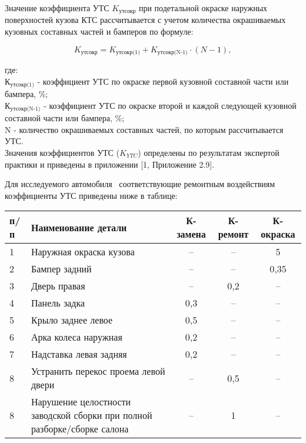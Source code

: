 \par   Значение коэффициента УТС $ K_{\text{утсокр}} $ при подетальной окраске наружных поверхностей кузова КТС рассчитывается с учетом количества окрашиваемых кузовных составных частей и бамперов по формуле:

\begin{equation}\label{f:yc}
K_{\text{утсокр}}=K_{\text{утсокр(1)}}+K_{\text{утсокр(N-1)}}\cdot(N-1), %
\end{equation}
        
\noindent где:\\
\noindent $ \text{К}_{\text{утсокр(1)}} $ - коэффициент УТС по окраске первой кузовной составной части или бампера, \%;\\
$ \text{К}_{\text{утсокр(N-1)}} $ - коэффициент УТС по окраске второй и каждой следующей кузовной составной части или бампера, \%;\\
N - количество окрашиваемых составных частей, по которым рассчитывается УТС.\\
Значения коэффициентов УТС ($ K_{YTC} $) определены по результатам экспертой практики и приведены в приложении [1, Приложение 2.9].

\par Для исследуемого автомобиля  \, соответствующие ремонтным воздействиям  коэффициенты УТС приведены ниже в таблице:

\begin{table}[H]
	\begin{tabular}{|p{5mm}|p{80mm}|c|c|c|}
	\hline 
	\textbf{п/п} & \textbf{Наименование детали} &\textbf{ К-замена }& \textbf{К-ремонт }&\textbf{ К-окраска} \\ 
	\hline 
	1 & Наружная окраска кузова & -- & -- & 5 \\ 
	\hline 
	2 & Бампер задний & -- & -- & 0,35 \\ 
	\hline 
	3 & Дверь правая & -- & 0,2 & -- \\ 
	\hline 
	4 & Панель задка & 0,3 & -- & -- \\ 
	\hline 
	5 & Крыло заднее левое & 0,5 & -- & -- \\ 
	\hline 
	6 & Арка колеса наружная & 0,2 & -- & -- \\ 
	\hline 
	7 & Надставка левая задняя & 0,2 & -- & -- \\ 
	\hline 
	8 &  Устранить перекос проема левой двери & -- & 0,5 & -- \\ 
	\hline 
	8 & Нарушение целостности заводской сборки при полной разборке/сборке салона & -- & 1 & -- \\ 
	\hline 
	
\end{tabular} 

\end{table}

